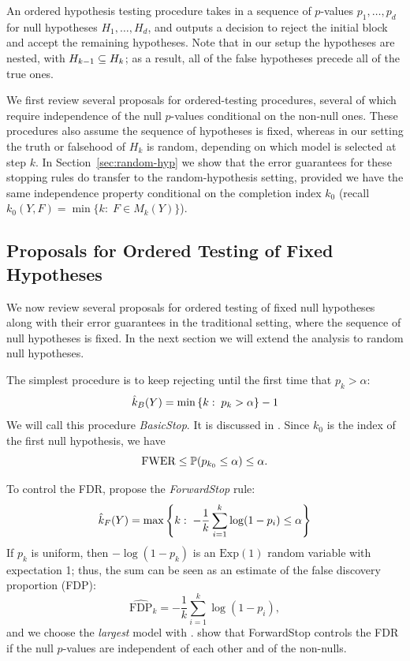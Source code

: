 \documentclass{article}
\begin{document}
An ordered hypothesis testing procedure takes in a sequence of $p$-values $p_1, \ldots, p_d$ for null hypotheses $H_{1}, \ldots, H_{d}$, and outputs a decision \smash{$\hk$} to reject the initial block  and accept the remaining hypotheses. Note that in our setup the hypotheses are nested, with $H_{k-1} \sub H_k$; as a result, all of the false hypotheses precede all of the true ones.

We first review several proposals for ordered-testing procedures, several of which require independence of the null $p$-values conditional on the non-null ones. These procedures also assume the sequence of hypotheses is fixed, whereas in our setting the truth or falsehood of $H_k$ is random, depending on which model is selected at step $k$. In Section~\ref{sec:random-hyp} we show that the error guarantees for these stopping rules do transfer to the random-hypothesis setting, provided we have the same independence property conditional on the completion index $k_0$ (recall 
$k_0(Y, F) = \min\{k:\; F \in M_k(Y)\}$).

\subsection{Proposals for Ordered Testing of Fixed Hypotheses}
\label{sec:orderedProposals}

We now review several proposals for ordered testing of fixed null hypotheses along with their error guarantees in the traditional setting, where the sequence of null hypotheses is fixed. In the next section we will extend the analysis to random null hypotheses.

The simplest procedure is to keep rejecting until the first time that $p_k > \alpha$: 
\[
\hk_B(Y) = \min\left\{k:\; p_k > \alpha\right\} - 1
\]
We will call this procedure {\em BasicStop}. It is discussed in \citet{marcus1976}.
Since $k_0$ is the index of the first null hypothesis, we have
\begin{equation}\label{eq:basic-stop-control}
 \text{FWER} \leq \P(p_{k_0} \leq \alpha) \leq \alpha.
\end{equation}

To control the FDR, \citet{gsell2013sequential} propose the {\em ForwardStop} rule:
\[
  \hk_{F}(Y) = \max\left\{k:\;
    -\frac{1}{k}\sum_{i=1}^k \log(1-p_i) \leq \alpha\right\}
\]
If $p_k$ is uniform, then $-\log(1-p_k)$ is an $\text{Exp}(1)$ random variable with expectation 1; thus, the sum can be seen as an estimate of the false discovery proportion (FDP):
\[
\widehat{\text{FDP}}_k = -\frac{1}{k}\sum_{i=1}^k \log(1-p_i),
\]
and we choose the {\em largest} model with . \citet{gsell2013sequential} show that ForwardStop controls the FDR if the null $p$-values are independent of each other and of the non-nulls.
\end{document}

